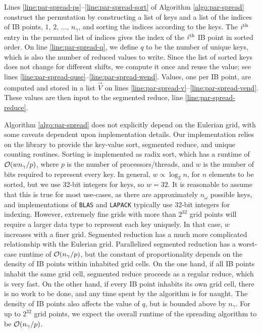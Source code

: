 Lines \ref{line:par-spread-ps}--\ref{line:par-spread-sort} of Algorithm
\ref{algo:par-spread} construct the permutation by constructing a list of keys and a list
of the indices of IB points, $1,\,2,\,\ldots,\,n_\gamma$, and sorting the indices
according to the keys. The $i\textsuperscript{th}$ entry in the permuted list of indices gives the index
of the $i\textsuperscript{th}$ IB point in sorted order. On line \ref{line:par-spread-q}, we define $q$
to be the number of unique keys, which is also the number of reduced values to write.
Since the list of sorted keys does not change for different shifts, we compute it once
and reuse the value; see lines \ref{line:par-spread-quse}--\ref{line:par-spread-wend}.
Values, one per IB point, are computed and stored in a list $\vec{V}$ on lines
\ref{line:par-spread-v}--\ref{line:par-spread-vend}. These values are then input to the
segmented reduce, line \ref{line:par-spread-reduce}.

Algorithm \ref{algo:par-spread} does not explicitly depend on the Eulerian grid, with
some caveats dependent upon implementation details. Our implementation relies on the
{\thrust} library to provide the key-value sort, segmented reduce, and unique counting
routines. Sorting is implemented as radix sort, which has a runtime of
$\mathcal{O}({wn_\gamma/p})$, where $p$ is the number of processors/threads, and $w$ is the
number of bits required to represent every key. In general, $w\propto\log_2 n$, for $n$
elements to be sorted, but we use 32-bit integers for keys, so $w=32$. It is reasonable
to assume that this is true for most use-cases, as there are approximately $n_\omega$
possible keys, and implementations of \texttt{BLAS} and \texttt{LAPACK} typically use
32-bit integers for indexing. However, extremely fine grids with more than $2^{32}$ grid
points will require a larger data type to represent each key uniquely. In that case, $w$
increases with a finer grid. Segmented reduction has a much more complicated relationship
with the Eulerian grid. Parallelized segmented reduction has a worst-case runtime of
$\mathcal{O}({n_\gamma/p})$, but the constant of proportionality depends on the density of IB
points within inhabited grid cells. On the one hand, if all IB points inhabit the same
grid cell, segmented reduce proceeds as a regular reduce, which is very fast. On the
other hand, if every IB point inhabits its own grid cell, there is no work to be done,
and any time spent by the algorithm is for naught. The density of IB points also affects
the value of $q$, but is bounded above by $n_\gamma$. For up to $2^{32}$ grid points, we
expect the overall runtime of the spreading algorithm to be $\mathcal{O}({n_\gamma/p})$.

